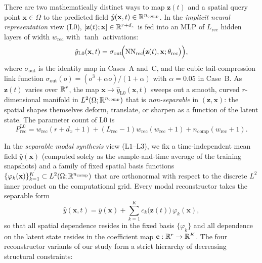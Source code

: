 There are two mathematically distinct ways to map $\mathbf{z}(t)$ and a spatial query point $\mathbf{x} \in \Omega$ to the predicted field $\hat{y}(\mathbf{x},t) \in \mathbb{R}^{n_{\mathrm{comp}}}$. In the \emph{implicit neural representation} view ($\mathrm{L0}$), $[\mathbf{z}(t); \mathbf{x}] \in \mathbb{R}^{r + d_x}$ is fed into an MLP of $L_{\mathrm{rec}}$ hidden layers of width $w_{\mathrm{rec}}$ with $\tanh$ activations:
\begin{equation}
  \hat{y}_{\mathrm{L0}}(\mathbf{x},t) = \sigma_{\mathrm{out}}\!\Big(\mathrm{NN}_{\mathrm{rec}}\!\big(\mathbf{z}(t), \mathbf{x}; \theta_{\mathrm{rec}}\big)\Big),
  \label{eq:L0_def}
\end{equation}
where $\sigma_{\mathrm{out}}$ is the identity map in Cases~A and~C, and the cubic tail-compression link function $\sigma_{\mathrm{out}}(o) = (o^3 + \alpha o)/(1 + \alpha)$ with $\alpha = 0.05$ in Case~B. As $\mathbf{z}(t)$ varies over $\mathbb{R}^r$, the map $\mathbf{x} \mapsto \hat{y}_{\mathrm{L0}}(\mathbf{x},t)$ sweeps out a smooth, curved $r$-dimensional manifold in $L^2(\Omega;\mathbb{R}^{n_{\mathrm{comp}}})$ that is \emph{non-separable} in $(\mathbf{z},\mathbf{x})$: the spatial shapes themselves deform, translate, or sharpen as a function of the latent state. The parameter count of $\mathrm{L0}$ is
\begin{equation}
  P_{\mathrm{rec}}^{\mathrm{L0}} = w_{\mathrm{rec}}(r + d_x + 1) + (L_{\mathrm{rec}} - 1)w_{\mathrm{rec}}(w_{\mathrm{rec}} + 1) + n_{\mathrm{comp}}(w_{\mathrm{rec}} + 1).
  \label{eq:P_rec_L0}
\end{equation}

In the \emph{separable modal synthesis} view ($\mathrm{L1}$--$\mathrm{L3}$), we fix a time-independent mean field $\bar{y}(\mathbf{x})$ (computed solely as the sample-and-time average of the training snapshots) and a family of fixed spatial basis functions $\{\varphi_k(\mathbf{x})\}_{k=1}^K \subset L^2(\Omega;\mathbb{R}^{n_{\mathrm{comp}}})$ that are orthonormal with respect to the discrete $L^2$ inner product on the computational grid. Every modal reconstructor takes the separable form
\begin{equation}
  \hat{y}(\mathbf{x},t) = \bar{y}(\mathbf{x}) + \sum_{k=1}^K c_k\!\big(\mathbf{z}(t)\big)\,\varphi_k(\mathbf{x}),
  \label{eq:modal_synthesis}
\end{equation}
so that all spatial dependence resides in the fixed basis $\{\varphi_k\}$ and all dependence on the latent state resides in the coefficient map $\mathbf{c} : \mathbb{R}^r \to \mathbb{R}^K$. The four reconstructor variants of our study form a strict hierarchy of decreasing structural constraints:

